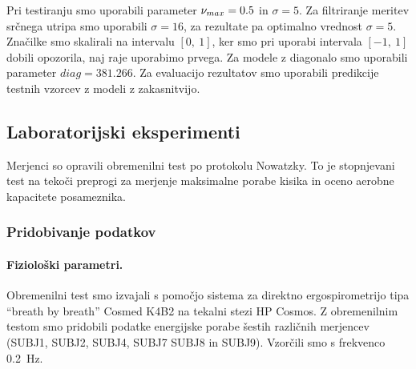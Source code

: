 Pri testiranju smo uporabili parameter $\nu_{max} = \num{0.5}$ in $\sigma=5$. Za filtriranje meritev srčnega utripa smo uporabili $\sigma=16$, za rezultate pa optimalno vrednost $\sigma=5$. Značilke smo skalirali na intervalu $[0,~1]$,  ker smo pri uporabi intervala $[-1,~1]$ dobili opozorila, naj raje uporabimo prvega. Za modele z diagonalo smo uporabili parameter $diag=\num{381.266}$. %
Za evaluacijo rezultatov smo uporabili predikcije testnih vzorcev z modeli z zakasnitvijo.

\subsection{Laboratorijski eksperimenti}
Merjenci so opravili obremenilni test po protokolu Nowatzky. To je stopnjevani test na tekoči preprogi za merjenje maksimalne porabe kisika in oceno aerobne kapacitete posameznika.

\subsubsection{Pridobivanje podatkov}
\paragraph{Fiziolo\v{s}ki parametri.}
Obremenilni test smo izvajali s pomočjo sistema za direktno ergospirometrijo tipa ``breath  by breath'' Cosmed K4B2 na tekalni stezi HP Cosmos. Z obremenilnim testom smo pridobili podatke energijske porabe šestih različnih merjencev (SUBJ1, SUBJ2, SUBJ4, SUBJ7 SUBJ8 in SUBJ9). Vzorčili smo s frekvenco \SI{0.2}{\hertz}.

